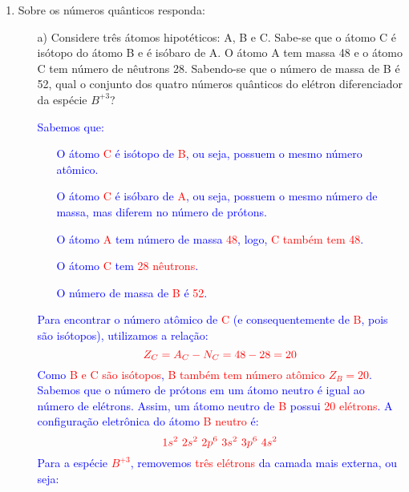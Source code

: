 \documentclass[a4paper, 12pt]{article}
\begin{document}
\begin{enumerate}
    \item Sobre os números quânticos responda:

          \begin{enumerate}
              \item[a)] Considere três átomos hipotéticos: A, B e C. Sabe-se que o átomo C é isótopo do átomo B e é isóbaro de A. O átomo A tem massa 48 e o átomo C tem número de nêutrons 28. Sabendo-se que o número de massa de B é 52, qual o conjunto dos quatro números quânticos do elétron diferenciador da espécie \( B^{+3} \)?
                    \\[2mm]
                    \textcolor{blue}{
                        Sabemos que:
                        \begin{itemize}
                            \item[] O átomo  \textcolor{red}{C} é isótopo de  \textcolor{red}{B}, ou seja, possuem o mesmo número atômico.
                            \item[] O átomo  \textcolor{red}{C} é isóbaro de  \textcolor{red}{A}, ou seja, possuem o mesmo número de massa, mas diferem no número de prótons.
                            \item[] O átomo  \textcolor{red}{A} tem número de massa  \textcolor{red}{48}, logo,  \textcolor{red}{C também tem 48}.
                            \item[] O átomo  \textcolor{red}{C} tem  \textcolor{red}{28 nêutrons}.
                            \item[] O número de massa de  \textcolor{red}{B} é  \textcolor{red}{52}.
                        \end{itemize}
                        Para encontrar o número atômico de  \textcolor{red}{C} (e consequentemente de  \textcolor{red}{B}, pois são isótopos), utilizamos a relação:
                        \[
                            \textcolor{red}{ Z_C = A_C - N_C = 48 - 28 = 20}
                        \]
                        Como  \textcolor{red}{B e C são isótopos},  \textcolor{red}{B também tem número atômico \( Z_B = 20 \)}.
                        Sabemos que o número de prótons em um átomo neutro é igual ao número de elétrons. Assim, um átomo neutro de  \textcolor{red}{B} possui  \textcolor{red}{20 elétrons}.
                        A configuração eletrônica do átomo  \textcolor{red}{B neutro} é:
                        \[
                            \textcolor{red}{1s^2 \ 2s^2 \ 2p^6 \ 3s^2 \ 3p^6 \ 4s^2}
                        \]
                        Para a espécie  \textcolor{red}{\( B^{+3} \)}, removemos  \textcolor{red}{três elétrons} da camada mais externa, ou seja:
}
\end{enumerate}
\end{enumerate}
\end{document}
